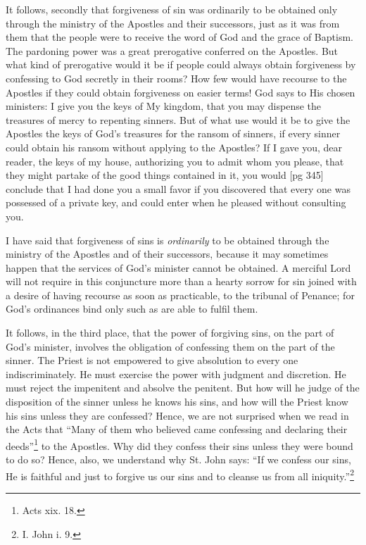 It follows, secondly that forgiveness of sin was
ordinarily to be obtained only through the ministry
of the Apostles and their successors, just as
it was from them that the people were to receive
the word of God and the grace of Baptism. The
pardoning power was a great prerogative conferred
on the Apostles. But what kind of prerogative
would it be if people could always obtain
forgiveness by confessing to God secretly in their
rooms? How few would have recourse to the
Apostles if they could obtain forgiveness on easier
terms! God says to His chosen ministers: I give
you the keys of My kingdom, that you may dispense
the treasures of mercy to repenting sinners.
But of what use would it be to give the Apostles
the keys of God's treasures for the ransom of
sinners, if every sinner could obtain his ransom
without applying to the Apostles? If I gave you,
dear reader, the keys of my house, authorizing you
to admit whom you please, that they might partake
of the good things contained in it, you would
[pg 345]
conclude that I had done you a small favor if you
discovered that every one was possessed of a private
key, and could enter when he pleased without consulting
you.

I have said that forgiveness of sins is \emph{ordinarily}
to be obtained through the ministry of the Apostles
and of their successors, because it may sometimes
happen that the services of God's minister
cannot be obtained. A merciful Lord will not require
in this conjuncture more than a hearty sorrow
for sin joined with a desire of having recourse
as soon as practicable, to the tribunal of Penance;
for God's ordinances bind only such as are able to
fulfil them.

It follows, in the third place, that the power of
forgiving sins, on the part of God's minister, involves
the obligation of confessing them on the
part of the sinner. The Priest is not empowered
to give absolution to every one indiscriminately.
He must exercise the power with judgment and
discretion. He must reject the impenitent and
absolve the penitent. But how will he judge of
the disposition of the sinner unless he knows his
sins, and how will the Priest know his sins unless
they are confessed? Hence, we are not surprised
when we read in the Acts that “Many of them who
believed came confessing and declaring their
deeds”\footnote{Acts xix.
18.} to the Apostles. Why did they confess
their sins unless they were bound to do so? Hence,
also, we understand why St. John says: “If we
confess our sins, He is faithful and just to forgive
us our sins and to cleanse us from all iniquity.”\footnote{I.
John i. 9.}

